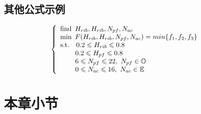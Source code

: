 \subsection{其他公式示例}
\begin{equation}
    \begin{aligned}
    \left\{
        \begin{array}{l}
        \text {find}\enspace H_{rib},H_{rib},N_{pf},N_{ac} \\
        \text {min} \enspace F(H_{rib},H_{rib},N_{pf},N_{ac})= min\{f_1,f_2,f_3\} \\

            \text{s.t.\enspace}\enspace 0.2 \leqslant H_{rib} \leqslant 0.8    \\
            \hspace{2.2em} 0.2 \leqslant H_{pf} \leqslant 0.8                     \\
            \hspace{2.2em} 6 \leqslant N_{pf} \leqslant 22,\ N_{pf}\in \mathbb{O} \\
            \hspace{2.2em} 0 \leqslant N_{ac} \leqslant 16,\ N_{ac}\in \mathbb{E}
        \end{array}
    \right. 
    \end{aligned}
    \label{eq:MO}
\end{equation}

\section{本章小节}